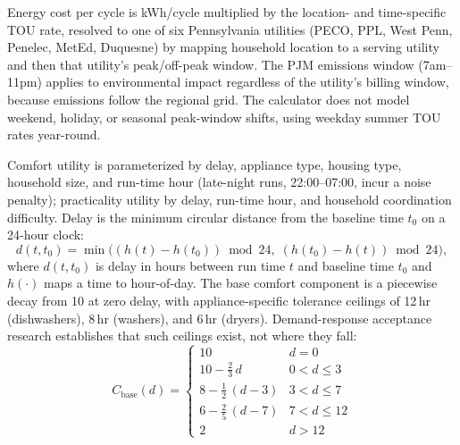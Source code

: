 \documentclass[final,3p,times]{elsarticle}
\begin{document}
Energy cost per cycle is kWh/cycle multiplied by the location- and time-specific TOU rate, resolved to one of six Pennsylvania utilities (PECO, PPL, West Penn, Penelec, MetEd, Duquesne) \cite{peco2021,ppl2025,firstenergy2025,firstenergy2026,duquesne2026} by mapping household location to a serving utility and then that utility's peak/off-peak window. The PJM emissions window (7am--11pm) applies to environmental impact regardless of the utility's billing window, because emissions follow the regional grid. The calculator does not model weekend, holiday, or seasonal peak-window shifts, using weekday summer TOU rates year-round.

Comfort utility is parameterized by delay, appliance type, housing type, household size, and run-time hour (late-night runs, 22:00--07:00, incur a noise penalty); practicality utility by delay, run-time hour, and household coordination difficulty. Delay is the minimum circular distance from the baseline time $t_0$ on a 24-hour clock:
\begin{equation}
  d(t,t_0)=\min\!\bigl((h(t)-h(t_0))\bmod 24,\; (h(t_0)-h(t))\bmod 24\bigr),
  \label{eq:appliance_delay_circular}
\end{equation}
\noindent where $d(t,t_0)$ is delay in hours between run time $t$ and baseline time $t_0$ and $h(\cdot)$ maps a time to hour-of-day. The base comfort component is a piecewise decay from 10 at zero delay, with appliance-specific tolerance ceilings of 12\,hr (dishwashers), 8\,hr (washers), and 6\,hr (dryers). Demand-response acceptance research \cite{paetz2012,waseem2020} establishes that such ceilings exist, not where they fall:
\begin{equation}
  C_{\mathrm{base}}(d)=
  \begin{cases}
    10                                  & d=0 \\[3pt]
    10-\frac{2}{3}\,d                   & 0<d\le 3 \\[3pt]
    8-\frac{1}{2}\,(d-3)                & 3<d\le 7 \\[3pt]
    6-\frac{2}{5}\,(d-7)                & 7<d\le 12 \\[3pt]
    2                                   & d>12
  \end{cases}
  \label{eq:appliance_base_comfort}
\end{equation}
\end{document}
